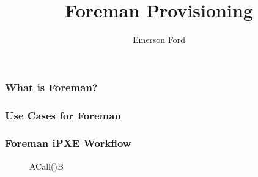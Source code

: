 \documentclass{beamer}
\title{Foreman Provisioning}
\author{Emerson Ford}
\date{}
\begin{document}
\frame{\titlepage}

\begin{frame}
	\frametitle{What is Foreman?}

\end{frame}

\begin{frame}
	\frametitle{Use Cases for Foreman}

\end{frame}

\begin{frame}
	\frametitle{Foreman iPXE Workflow}

	\begin{figure}
		\centering
		\begin{sequencediagram}

			\begin{call}{A}{Call()}{B}{}
			\end{call}
		\end{sequencediagram}
	\end{figure}

\end{frame}
\end{document}
